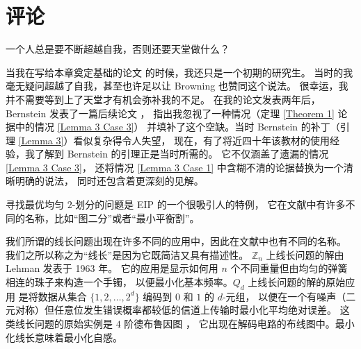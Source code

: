 \documentclass[12pt, a4paper]{article}
\begin{document}
\section{评论}
\label{Section 4}

\begin{displayquote}
一个人总是要不断超越自我，否则还要天堂做什么？
\end{displayquote}

当我在写给本章奠定基础的论文 \cite{Harper.1964} 的时候，我还只是一个初期的研究生。
当时的我毫无疑问超越了自我，甚至也许足以让 Browning 也赞同这个说法。
很幸运，我并不需要等到上了天堂才有机会弥补我的不足。
在我的论文发表两年后，Bernstein 发表了一篇后续论文 \cite{Bernstein.1967}，
指出我忽视了一种情况（定理 \ref{Theorem 1} 论据中的情况 \ref{Lemma 3 Case 3}）
并填补了这个空缺。当时 Bernstein 的补丁（引理 \ref{Lemma 3}）看似复杂得令人失望，
现在，有了将近四十年该教材的使用经验，我了解到 Bernstein 的引理正是当时所需的。
它不仅涵盖了遗漏的情况 \ref{Lemma 3 Case 3}，
还将情况 \ref{Lemma 3 Case 1} 中含糊不清的论据替换为一个清晰明确的说法，
同时还包含着更深刻的见解。

寻找最优均匀 $2$-划分的问题是 EIP 的一个很吸引人的特例，
它在文献中有许多不同的名称，比如“图二分”或者“最小平衡割”。

我们所谓的线长问题出现在许多不同的应用中，因此在文献中也有不同的名称。
我们之所以称之为“线长”是因为它既简洁又具有描述性。
$\mathbb{Z}_n$ 上线长问题的解由 Lehman \cite{Lehman.1963} 发表于 1963 年。
它的应用是显示如何用 $n$ 个不同重量但由均匀的弹簧相连的珠子来构造一个手镯，
以便最小化基本频率。$Q_d$ 上线长问题的解的原始应用 \cite{Harper.1964} 是将数据从集合
$\{1, 2, \dots, 2^d\}$ 编码到 $0$ 和 $1$ 的 $d$-元组，
以便在一个有噪声（二元对称）但任意位发生错误概率都较低的信道上传输时最小化平均绝对误差。
这类线长问题的原始实例是 $4$ 阶德布鲁因图 \cite{Harper.1970}，
它出现在解码电路的布线图中。最小化线长意味着最小化自感。
\end{document}
